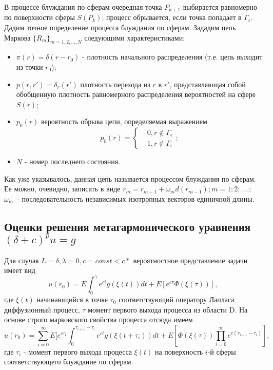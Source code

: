 В процессе блуждания по сферам очередная точка $P_{k+1}$ выбирается равномерно по поверхности сферы $S(P_{k})$; процесс обрывается, если точка попадает в $ \Gamma_{\epsilon }$. Дадим точное определение процесса блуждания по сферам. Зададим цепь Маркова $\{R_{m}\}_{m=1,2,\dots,N} $ следующими характеристиками:\begin{itemize}
	\item $\pi (r) = \delta(r-r_{0})$ - плотность начального распределения (т.е. цепь выходит из точки $r_0$);
	\item $p(r,r') = \delta_{r}(r') $ плотность перехода из $r$ в $r'$, представляющая собой обобщенную плотность равномерного распределения вероятностей на сфере $S(r)$;
	\item $p_{0}(r)$ вероятность обрыва цепи, определяемая выражением \begin{equation} p_{0}(r)= 
	\left\{
\begin{aligned}
& 0, r \notin \Gamma_{\epsilon}\\ & 1, r\notin \Gamma_{\epsilon}
\end{aligned};
 \right. \end{equation}
\item{}$N$ - номер последнего состояния.
\end{itemize}
Как уже указывалось, данная цепь называется процессом блуждания по сферам. Ее можно, очевидно, записать в виде $r_{m} = r_{m-1} + \omega_{m}d(r_{m-1}); m = 1; 2;....;$
$\omega_{m}$ -- последовательность независимых изотропных векторов единичной
 длины.
\subsection{Оценки решения метагармонического уравнения$(\delta+c)^{p}u=g $}
Для случая $L=\delta, \lambda=0,c = const<c*$ вероятностное представление задачи имеет вид 
\begin{equation} u(r_{0})=E\int_{0}^{\gamma}e^{ct}g(\xi(t))dt+E[e^{c\tau}\Phi(\xi(\tau))],\end{equation}
где $\xi(t)$  начинающийся в точке $r_{0}$ соответствующий оператору Лапласа диффузионный процесс, $\tau $  момент первого выхода процесса из области D. На основе строго марковского свойства процесса отсюда имеем 
\begin{equation} u(r_{0})=\sum_{i=0}^{\infty} E [e^{c\tau_{i}} \int_{0}^{\tau_{i+1}-\tau_{i}}e^{ct}g(\xi(t+\tau_{i}))dt+E[\Phi(\xi(\tau)){}
\prod_{i=0}^{\infty}e^{c(\tau_{i+1}-\tau_{i})}],\end{equation}
где $ \tau_{i}$ - момент первого выхода процесса $\xi(t)$ на поверхность $i$-й сферы соответствующего блуждание по сферам.
